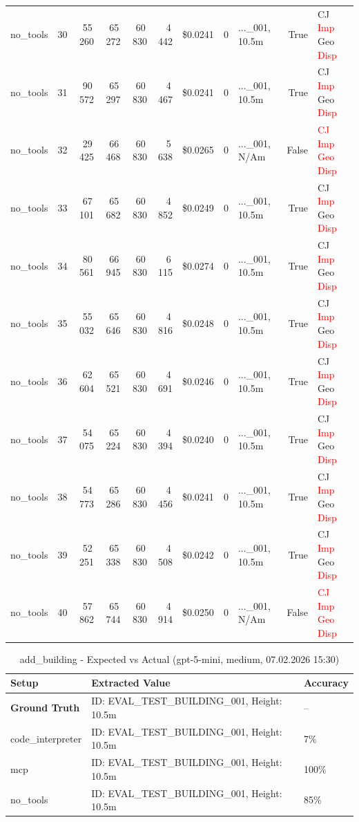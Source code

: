 \documentclass[a4paper,11pt]{article}
\begin{document}
\begin{table}[H]
{\begin{tabular}{l r r r r r r r l r l}
no\_tools & 30 & 55\,260 & 65\,272 & 60\,830 & 4\,442 & \$0.0241 & 0 & ...\_001, 10.5m & True & CJ \textcolor{red}{Imp} Geo \textcolor{red}{Disp} \\
no\_tools & 31 & 90\,572 & 65\,297 & 60\,830 & 4\,467 & \$0.0241 & 0 & ...\_001, 10.5m & True & CJ \textcolor{red}{Imp} Geo \textcolor{red}{Disp} \\
no\_tools & 32 & 29\,425 & 66\,468 & 60\,830 & 5\,638 & \$0.0265 & 0 & ...\_001, N/Am & False & \textcolor{red}{CJ} \textcolor{red}{Imp} \textcolor{red}{Geo} \textcolor{red}{Disp} \\
no\_tools & 33 & 67\,101 & 65\,682 & 60\,830 & 4\,852 & \$0.0249 & 0 & ...\_001, 10.5m & True & CJ \textcolor{red}{Imp} Geo \textcolor{red}{Disp} \\
no\_tools & 34 & 80\,561 & 66\,945 & 60\,830 & 6\,115 & \$0.0274 & 0 & ...\_001, 10.5m & True & CJ \textcolor{red}{Imp} Geo \textcolor{red}{Disp} \\
no\_tools & 35 & 55\,032 & 65\,646 & 60\,830 & 4\,816 & \$0.0248 & 0 & ...\_001, 10.5m & True & CJ \textcolor{red}{Imp} Geo \textcolor{red}{Disp} \\
no\_tools & 36 & 62\,604 & 65\,521 & 60\,830 & 4\,691 & \$0.0246 & 0 & ...\_001, 10.5m & True & CJ \textcolor{red}{Imp} Geo \textcolor{red}{Disp} \\
no\_tools & 37 & 54\,075 & 65\,224 & 60\,830 & 4\,394 & \$0.0240 & 0 & ...\_001, 10.5m & True & CJ \textcolor{red}{Imp} Geo \textcolor{red}{Disp} \\
no\_tools & 38 & 54\,773 & 65\,286 & 60\,830 & 4\,456 & \$0.0241 & 0 & ...\_001, 10.5m & True & CJ \textcolor{red}{Imp} Geo \textcolor{red}{Disp} \\
no\_tools & 39 & 52\,251 & 65\,338 & 60\,830 & 4\,508 & \$0.0242 & 0 & ...\_001, 10.5m & True & CJ \textcolor{red}{Imp} Geo \textcolor{red}{Disp} \\
no\_tools & 40 & 57\,862 & 65\,744 & 60\,830 & 4\,914 & \$0.0250 & 0 & ...\_001, N/Am & False & \textcolor{red}{CJ} \textcolor{red}{Imp} \textcolor{red}{Geo} \textcolor{red}{Disp} \\
\bottomrule
\end{tabular}}
\end{table}

\begin{table}[H]
\centering
\scriptsize
\caption{add\_building - Expected vs Actual (gpt-5-mini, medium, 07.02.2026 15:30)}
\begin{tabular}{l l l}
\toprule
Setup & Extracted Value & Accuracy \\
\midrule
\textbf{Ground Truth} & ID: EVAL\_TEST\_BUILDING\_001, Height: 10.5m & -- \\
\midrule
code\_interpreter & ID: EVAL\_TEST\_BUILDING\_001, Height: 10.5m & 7\% \\
mcp & ID: EVAL\_TEST\_BUILDING\_001, Height: 10.5m & 100\% \\
no\_tools & ID: EVAL\_TEST\_BUILDING\_001, Height: 10.5m & 85\% \\
\bottomrule
\end{tabular}
\end{table}

\clearpage
\end{document}

